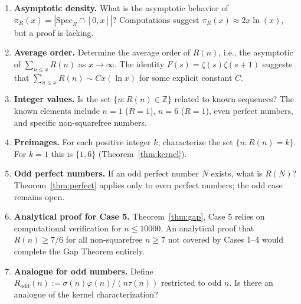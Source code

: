 \documentclass[12pt]{article}
\newcommand{\SpecR}{\mathrm{Spec}_R}
\newcommand{\Z}{\mathbb{Z}}
\begin{document}
\begin{enumerate}
  \item \textbf{Asymptotic density.}
    What is the asymptotic behavior of $\pi_R(x) = |\SpecR\cap[0,x]|$?
    Computations suggest $\pi_R(x)\approx 2x\ln(x)$, but a proof is lacking.

  \item \textbf{Average order.}
    Determine the average order of $R(n)$, i.e., the asymptotic of
    $\sum_{n\le x}R(n)$ as $x\to\infty$.  The identity $F(s)=\zeta(s)\zeta(s+1)$
    suggests that $\sum_{n\le x}R(n)\sim Cx(\ln x)$ for some explicit constant $C$.

  \item \textbf{Integer values.}
    Is the set $\{n : R(n)\in\Z\}$ related to known sequences?  The known
    elements include $n=1$ ($R=1$), $n=6$ ($R=1$), even perfect numbers, and
    specific non-squarefree numbers.

  \item \textbf{Preimages.}
    For each positive integer $k$, characterize the set $\{n : R(n)=k\}$.
    For $k=1$ this is $\{1,6\}$ (Theorem~\ref{thm:kernel}).

  \item \textbf{Odd perfect numbers.}
    If an odd perfect number $N$ exists, what is $R(N)$?
    Theorem~\ref{thm:perfect} applies only to even perfect numbers;
    the odd case remains open.

  \item \textbf{Analytical proof for Case 5.}
    Theorem~\ref{thm:gap}, Case 5 relies on computational verification for
    $n\le10000$.  An analytical proof that $R(n)\ge7/6$ for all non-squarefree
    $n\ge7$ not covered by Cases 1--4 would complete the Gap Theorem entirely.

  \item \textbf{Analogue for odd numbers.}
    Define $R_\mathrm{odd}(n) := \sigma(n)\varphi(n)/(n\tau(n))$ restricted to odd
    $n$.  Is there an analogue of the kernel characterization?
\end{enumerate}
\end{document}
